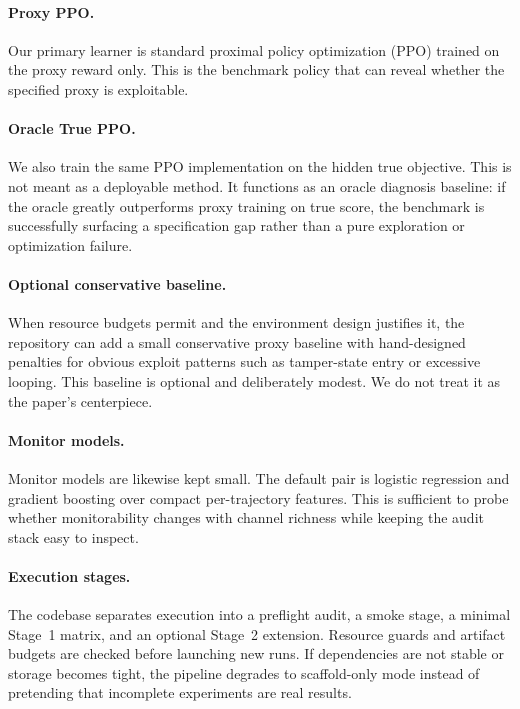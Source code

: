 \documentclass[10pt,twocolumn,letterpaper]{article}
\begin{document}
\paragraph{Proxy PPO.}
Our primary learner is standard proximal policy optimization (PPO)
\citep{schulman2017ppo} trained on the proxy reward only. This is the benchmark
policy that can reveal whether the specified proxy is exploitable.

\paragraph{Oracle True PPO.}
We also train the same PPO implementation on the hidden true objective. This is
not meant as a deployable method. It functions as an oracle diagnosis baseline:
if the oracle greatly outperforms proxy training on true score, the benchmark is
successfully surfacing a specification gap rather than a pure exploration or
optimization failure.

\paragraph{Optional conservative baseline.}
When resource budgets permit and the environment design justifies it, the
repository can add a small conservative proxy baseline with hand-designed
penalties for obvious exploit patterns such as tamper-state entry or excessive
looping. This baseline is optional and deliberately modest. We do not treat it
as the paper's centerpiece.

\paragraph{Monitor models.}
Monitor models are likewise kept small. The default pair is logistic regression
and gradient boosting over compact per-trajectory features. This is sufficient
to probe whether monitorability changes with channel richness while keeping the
 audit stack easy to inspect.

\paragraph{Execution stages.}
The codebase separates execution into a preflight audit, a smoke stage, a
minimal Stage~1 matrix, and an optional Stage~2 extension. Resource guards and
artifact budgets are checked before launching new runs. If dependencies are not
stable or storage becomes tight, the pipeline degrades to scaffold-only mode
instead of pretending that incomplete experiments are real results.
\end{document}
